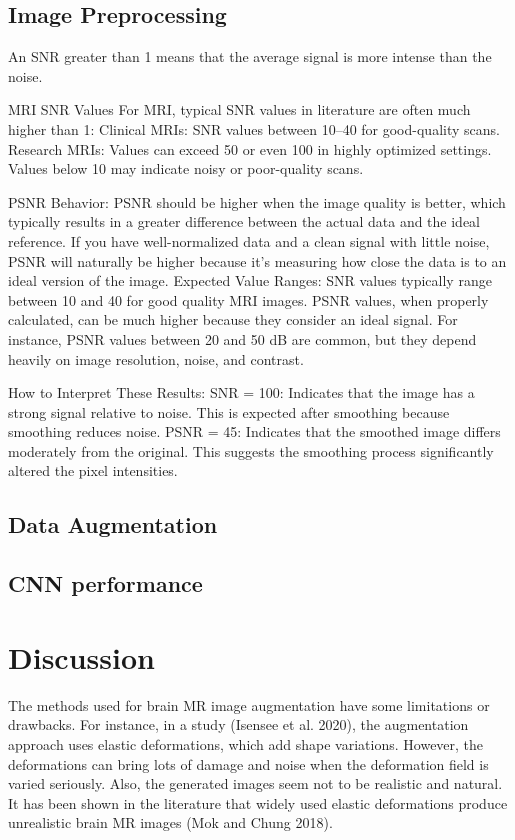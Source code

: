 \subsection{Image Preprocessing}

An SNR greater than 1 means that the average signal is more intense than the noise.

MRI SNR Values
For MRI, typical SNR values in literature are often much higher than 1:
Clinical MRIs: SNR values between 10–40 for good-quality scans.
Research MRIs: Values can exceed 50 or even 100 in highly optimized settings.
Values below 10 may indicate noisy or poor-quality scans.

PSNR Behavior:
PSNR should be higher when the image quality is better, which typically results in a greater difference between the actual data and the ideal reference.
If you have well-normalized data and a clean signal with little noise, PSNR will naturally be higher because it’s measuring how close the data is to an ideal version of the image.
Expected Value Ranges:
SNR values typically range between 10 and 40 for good quality MRI images.
PSNR values, when properly calculated, can be much higher because they consider an ideal signal. For instance, PSNR values between 20 and 50 dB are common, but they depend heavily on image resolution, noise, and contrast.

How to Interpret These Results:
SNR = 100: Indicates that the image has a strong signal relative to noise. This is expected after smoothing because smoothing reduces noise.
PSNR = 45: Indicates that the smoothed image differs moderately from the original. This suggests the smoothing process significantly altered the pixel intensities.

\subsection{Data Augmentation}

\subsection{CNN performance}

\lipsum[5-6]

\section{Discussion}

The methods used for brain MR image augmentation have some limitations or drawbacks. For instance, in a study (Isensee et al. 2020), the augmentation approach uses elastic deformations, which add shape variations. However, the deformations can bring lots of damage and noise when the deformation field is varied seriously. Also, the generated images seem not to be realistic and natural. It has been shown in the literature that widely used elastic deformations produce unrealistic brain MR images (Mok and Chung 2018).

